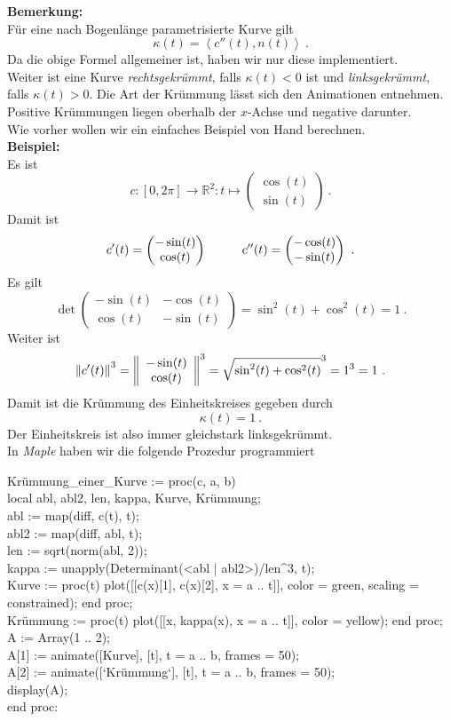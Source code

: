 \documentclass[12pt]{article}
\newcommand{\dabs}[1]{\ensuremath{\left\Vert#1\right\Vert}}
\newcommand{\skalar}[1]{\ensuremath{\left\langle#1\right\rangle}}
\renewcommand{\det}{\operatorname{det}}
\newcommand\tab[1][1cm]{\hspace*{#1}}
\newenvironment{Code}{\begin{mdframed}[topline=false,bottomline=false,linewidth=1pt]\begin{scriptsize}\begin{tt}}
{\end{tt}\end{scriptsize}\end{mdframed}}
\begin{document}
\textbf{Bemerkung:}\\
Für eine nach Bogenlänge parametrisierte Kurve gilt
\[\kappa(t) = \skalar{c''(t), n(t)}~.\]
Da die obige Formel allgemeiner ist, haben wir nur diese implementiert.\\
Weiter ist eine Kurve \textit{rechtsgekrümmt}, falls $\kappa(t) < 0$ ist und \textit{linksgekrümmt}, falls $\kappa(t) > 0$. Die Art der Krümmung lässt sich den Animationen entnehmen. Positive Krümmungen liegen oberhalb der $x$-Achse und negative darunter.\\

Wie vorher wollen wir ein einfaches Beispiel von Hand berechnen.\\
\textbf{Beispiel:}\\
Es ist
\[c: [0, 2\pi] \rightarrow \mathbb{R}^2: t \mapsto \begin{pmatrix}
\cos(t) \\ \sin(t)\end{pmatrix}~.\]
Damit ist
\[c'(t) = \begin{pmatrix}
-\sin(t) \\ \cos(t)\end{pmatrix} \tab c''(t) = \begin{pmatrix}
-\cos(t) \\ -\sin(t)\end{pmatrix}~.\]
Es gilt
\[\det\begin{pmatrix}
-\sin(t) & -\cos(t)\\
\cos(t) & -\sin(t)
\end{pmatrix} = \sin^2(t) + \cos^2(t) = 1~.\]
Weiter ist
\[\dabs{c'(t)}^3 = \dabs{\begin{array}{c c} -\sin(t) \\ \cos(t) \end{array}}^3 = \sqrt {\sin^2(t) + \cos^2(t)}^3 = 1^3 = 1~.\]
Damit ist die Krümmung des Einheitskreises gegeben durch
\[\kappa(t) = 1~.\]
Der Einheitskreis ist also immer gleichstark linksgekrümmt.\\

In \textit{Maple} haben wir die folgende Prozedur programmiert
\begin{Code}
Krümmung\_einer\_Kurve := proc(c, a, b)\\
local abl, abl2, len, kappa, Kurve, Krümmung;\\
abl := map(diff, c(t), t);\\
abl2 := map(diff, abl, t);\\
len := sqrt(norm(abl, 2));\\
kappa := unapply(Determinant(<abl | abl2>)/len\^{}3, t);\\
Kurve := proc(t) plot([[c(x)[1], c(x)[2], x = a .. t]], color = green, scaling = constrained); end proc;\\
Krümmung := proc(t) plot([[x, kappa(x), x = a .. t]], color = yellow); end proc;\\
A := Array(1 .. 2);\\
A[1] := animate([Kurve], [t], t = a .. b, frames = 50);\\
A[2] := animate([`Krümmung`], [t], t = a .. b, frames = 50);\\
display(A);\\
end proc:
\end{Code}
\end{document}
